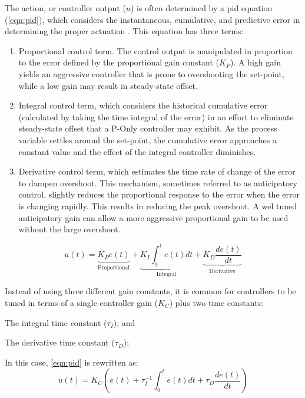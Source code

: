 The action, or controller output ($u$) is often determined by a \acf{pid} equation (\ref{eqn:pid}), which considers the instantaneous, cumulative, and predictive error in determining the proper actuation \cite{Bequette}. This equation has three terms:
\begin{enumerate}
\item Proportional control term. The control output is manipulated in proportion to the error defined by the proportional gain constant ($K_P$). A high gain yields an aggressive controller that is prone to overshooting the set-point, while a low gain may result in steady-state offset.  
\item Integral control term, which considers the historical cumulative error (calculated by taking the time integral of the error) in an effort to eliminate steady-state offset that a P-Only controller may exhibit. As the process variable settles around the set-point, the cumulative error approaches a constant value and the effect of the integral controller diminishes.
\item Derivative control term, which estimates the time rate of change of the error to dampen overshoot. This mechanism, sometimes referred to as anticipatory control, slightly reduces the proportional response to the error when the error is changing rapidly. This results in reducing the peak overshoot. A wel tuned anticipatory gain can allow a more aggressive proportional gain to be used without the large overshoot.
\end{enumerate}

\begin{equation}\label{eqn:pid}
    u(t) 
    = \underbrace{K_P e(t)}_{\text{Proportional}} 
    + \underbrace{K_I \int_0^t e(t)dt}_{\text{Integral}} 
    + \underbrace{K_D \frac{de(t)}{dt}}_{\text{Derivative}}
\end{equation}

Instead of using three different gain constants, it is common for controllers to be tuned in terms of a single controller gain ($K_C$) plus two time constants: 
\begin{enumerate*}
    \item The integral time constant ($\tau_I$); and
    \item The derivative time constant ($\tau_D$);
\end{enumerate*}
In this case, \ref{eqn:pid} is rewritten as:
\begin{equation}\label{eqn:pid-tau}
    u(t) = K_C \left( e(t) + \tau_I^{-1} \int_0^t e(t)dt + \tau_D \frac{de(t)}{dt}\right)
\end{equation}


